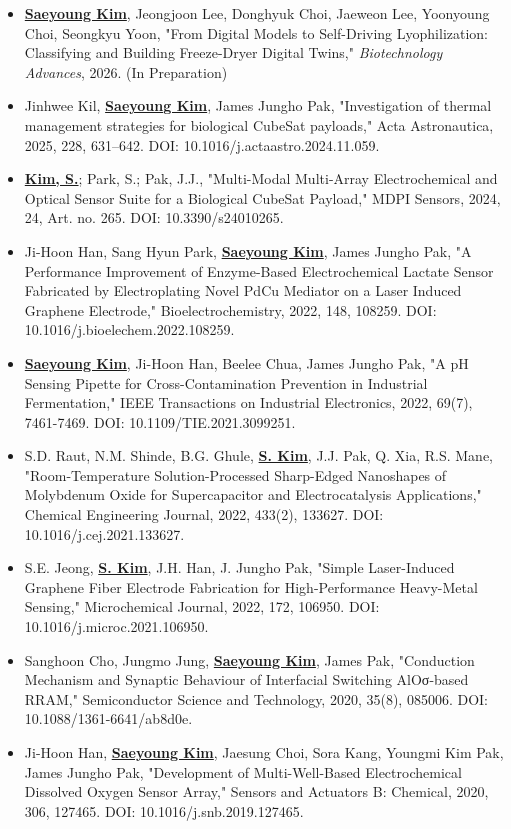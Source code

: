 \documentclass[letterpaper,11pt]{moderncv}
\begin{document}
\begin{sloppypar}
\begin{itemize}[leftmargin=1cm, itemsep=0pt, parsep=0pt]
    \item \textbf{\underline{Saeyoung Kim}}, Jeongjoon Lee, Donghyuk Choi, Jaeweon Lee, Yoonyoung Choi, Seongkyu Yoon, "From Digital Models to Self-Driving Lyophilization: Classifying and Building Freeze-Dryer Digital Twins," \textit{Biotechnology Advances}, 2026. (In Preparation)
    \item Jinhwee Kil, \textbf{\underline{Saeyoung Kim}}, James Jungho Pak, "Investigation of thermal management strategies for biological CubeSat payloads," Acta Astronautica, 2025, 228, 631--642. DOI: 10.1016/j.actaastro.2024.11.059.
    \item \textbf{\underline{Kim, S.}}; Park, S.; Pak, J.J., "Multi-Modal Multi-Array Electrochemical and Optical Sensor Suite for a Biological CubeSat Payload," MDPI Sensors, 2024, 24, Art. no. 265. DOI: 10.3390/s24010265.
    \item Ji-Hoon Han, Sang Hyun Park, \textbf{\underline{Saeyoung Kim}}, James Jungho Pak, "A Performance Improvement of Enzyme-Based Electrochemical Lactate Sensor Fabricated by Electroplating Novel PdCu Mediator on a Laser Induced Graphene Electrode," Bioelectrochemistry, 2022, 148, 108259. DOI: 10.1016/j.bioelechem.2022.108259.
    \item \textbf{\underline{Saeyoung Kim}}, Ji-Hoon Han, Beelee Chua, James Jungho Pak, "A pH Sensing Pipette for Cross-Contamination Prevention in Industrial Fermentation," IEEE Transactions on Industrial Electronics, 2022, 69(7), 7461-7469. DOI: 10.1109/TIE.2021.3099251.
    \item S.D. Raut, N.M. Shinde, B.G. Ghule, \textbf{\underline{S. Kim}}, J.J. Pak, Q. Xia, R.S. Mane, "Room-Temperature Solution-Processed Sharp-Edged Nanoshapes of Molybdenum Oxide for Supercapacitor and Electrocatalysis Applications," Chemical Engineering Journal, 2022, 433(2), 133627. DOI: 10.1016/j.cej.2021.133627.
    \item S.E. Jeong, \textbf{\underline{S. Kim}}, J.H. Han, J. Jungho Pak, "Simple Laser-Induced Graphene Fiber Electrode Fabrication for High-Performance Heavy-Metal Sensing," Microchemical Journal, 2022, 172, 106950. DOI: 10.1016/j.microc.2021.106950.
    \item Sanghoon Cho, Jungmo Jung, \textbf{\underline{Saeyoung Kim}}, James Pak, "Conduction Mechanism and Synaptic Behaviour of Interfacial Switching AlOσ-based RRAM," Semiconductor Science and Technology, 2020, 35(8), 085006. DOI: 10.1088/1361-6641/ab8d0e.
    \item Ji-Hoon Han, \textbf{\underline{Saeyoung Kim}}, Jaesung Choi, Sora Kang, Youngmi Kim Pak, James Jungho Pak, "Development of Multi-Well-Based Electrochemical Dissolved Oxygen Sensor Array," Sensors and Actuators B: Chemical, 2020, 306, 127465. DOI: 10.1016/j.snb.2019.127465.
\end{itemize}
\end{sloppypar}
\end{document}
